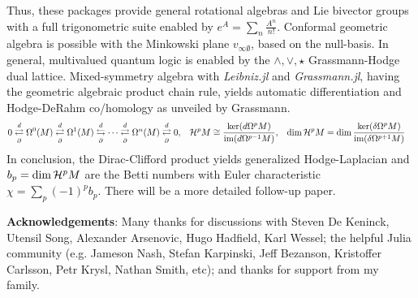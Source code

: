 \documentclass{juliacon}
\begin{document}
Thus, these packages provide general rotational algebras and Lie bivector groups with a full trigonometric suite enabled by $ e^{A} = \sum_n \frac{A^n}{n!} $.
Conformal geometric algebra is possible with the Minkowski plane $v_{\infty\emptyset}$, based on the null-basis.
In general, multivalued quantum logic is enabled by the $\wedge,\vee,\star$ Grassmann-Hodge dual lattice.
Mixed-symmetry algebra with \textit{Leibniz.jl} and \textit{Grassmann.jl}, having the geometric algebraic product chain rule, yields automatic differentiation and Hodge-DeRahm co/homology  as unveiled by Grassmann.
\begin{align*}
	0 &\overset{d}{\underset{\partial}{\rightleftarrows}} \Omega^0(M) \overset{d}{\underset{\partial}{\rightleftarrows}} \Omega^1(M) \overset{d}{\underset{\partial}{\leftrightarrows}} \cdots \overset{d}{\underset{\partial}{\rightleftarrows}} \Omega^n(M) \overset{d}{\underset{\partial}{\rightleftarrows}} 0, & \mathcal{H}^pM &\cong \frac{\ker(d\Omega^pM)}{\text{im}(d\Omega^{p-1}M)}, & \dim\mathcal{H}^pM &= \dim\frac{\ker(\delta\Omega^pM)}{\text{im}(\delta\Omega^{p+1}M)}
\end{align*}
In conclusion, the Dirac-Clifford product yields generalized Hodge-Laplacian and $b_p=\dim\mathcal{H}^pM$ are the Betti numbers with Euler characteristic $\chi = \sum_p (-1)^pb_p$.
There will be a more detailed follow-up paper.

\textbf{Acknowledgements}: Many thanks for discussions with Steven De Keninck, Utensil Song, Alexander Arsenovic, Hugo Hadfield, Karl Wessel; the helpful Julia community (e.g. Jameson Nash, Stefan Karpinski, Jeff Bezanson, Kristoffer Carlsson, Petr Krysl, Nathan Smith, etc); and thanks for support from my family.



\end{document}
